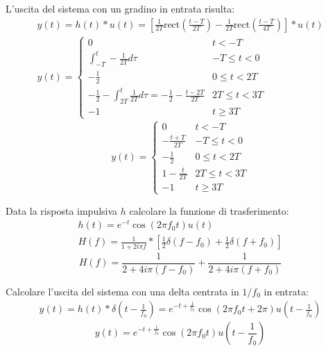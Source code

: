 \documentclass{article}
\begin{document}

L'uscita del sistema con un gradino in entrata risulta:
\begin{gather*}
    y(t)=h(t)*u(t)=\left[\displaystyle\frac{1}{2T}\mbox{rect}\left(\frac{t-T}{2T}\right)-\frac{1}{2T}\mbox{rect}\left(\frac{t-T}{4T}\right)\right]*u(t)\\
    y(t)=\begin{cases}
        0&t<-T\\
        \displaystyle\int_{-T}^t-\frac{1}{2T}d\tau&-T\leq t<0\\
        -\displaystyle\frac{1}{2}&0\leq t<2T\\
        \displaystyle-\frac{1}{2}-\int_{2T}^t\frac{1}{2T}d\tau =\displaystyle-\frac{1}{2}-\frac{t-2T}{2T}&2T\leq t<3T\\
        -1&t\geq 3T
    \end{cases}
\end{gather*}
\begin{equation}
    y(t)=\begin{cases}
        0&t<-T\\
        \displaystyle-\frac{t+T}{2T}&-T\leq t<0\\
        \displaystyle-\frac{1}{2}&0\leq t<2T\\
        1-\displaystyle\frac{t}{2T}&2T\leq t<3T\\
        -1 &t\geq 3T
    \end{cases}
\end{equation}




Data la risposta impulsiva $h$ calcolare la funzione di trasferimento:
\begin{gather*}
    h(t)=e^{-t}\cos(2\pi f_0t)u(t)\\
    H(f)=\displaystyle\frac{1}{1+2i\pi f}*\left[\frac{1}{2}\delta(f-f_0)+\frac{1}{2}\delta(f+f_0)\right]
\end{gather*}
\begin{equation}
    H(f)=\displaystyle\frac{1}{2+4i\pi (f-f_0)}+\frac{1}{2+4i\pi (f+f_0)}
\end{equation}


Calcolare l'uscita del sistema con una delta centrata in $1/f_0$ in entrata:
\begin{gather*}
    y(t)=h(t)*\delta\left(t-\displaystyle\frac{1}{f_0}\right)=e^{-t+\frac{1}{f_0}}\cos\left(2\pi f_0t+2\pi\right)u\left(t-\frac{1}{f_0}\right)
\end{gather*}
\begin{equation}
    y(t)=e^{-t+\frac{1}{f_0}}\cos\left(2\pi f_0t\right)u\left(t-\frac{1}{f_0}\right)
\end{equation}
\end{document}
